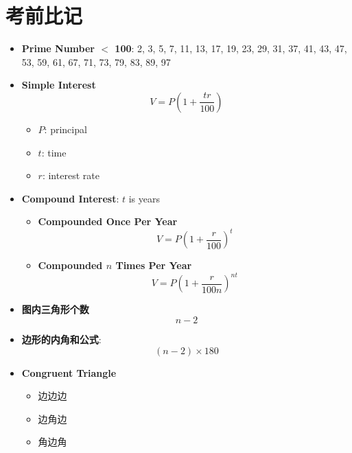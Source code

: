 \appendix
\chapter{考前比记}

\begin{multicols}{2}
  \begin{itemize}
    \item \textbf{Prime Number $ < $ 100}: 2, 3, 5, 7, 11, 13, 17, 19, 23, 29,
    31, 37, 41, 43, 47, 53, 59, 61, 67, 71, 73, 79, 83, 89, 97

    \item \textbf{Simple Interest}
    \begin{equation}
      V = P \left( 1 + \frac{tr}{100} \right)
    \end{equation}

    \begin{itemize}
      \item $ P $: principal
      \item $ t $: time
      \item $ r $: interest rate
    \end{itemize}

    \item \textbf{Compound Interest}: $ t $ is years
    \begin{itemize}
      \item \textbf{Compounded Once Per Year}
      \begin{equation}
        V = P \left( 1 + \frac{r}{100} \right)^{t}
      \end{equation}

      \item \textbf{Compounded $ n $ Times Per Year}
      \begin{equation}
        V = P \left( 1 + \frac{r}{100n} \right)^{nt}
      \end{equation}
    \end{itemize}

    \item \textbf{图内三角形个数}
    \begin{equation}
      n - 2
    \end{equation}

    \item \textbf{边形的内角和公式}:
    \begin{equation}
      \left( n - 2 \right) \times 180
    \end{equation}

    \item \textbf{Congruent Triangle}
    \begin{itemize}
      \item 边边边
      \item 边角边
      \item 角边角
    \end{itemize}


\end{itemize}
\end{multicols}
